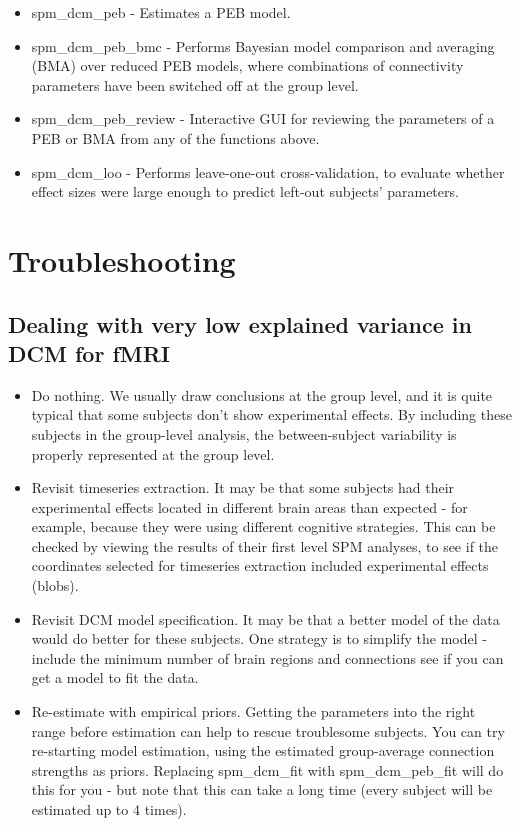 \documentclass{article}
\begin{document}
\begin{itemize}
    \item spm\_dcm\_peb - Estimates a PEB model.
    \item spm\_dcm\_peb\_bmc - Performs Bayesian model comparison and averaging (BMA) over reduced PEB models, where combinations of connectivity parameters have been switched off at the group level.
    \item spm\_dcm\_peb\_review - Interactive GUI for reviewing the parameters of a PEB or BMA from any of the functions above.
    \item spm\_dcm\_loo - Performs leave-one-out cross-validation, to evaluate whether effect sizes were large enough to predict left-out subjects' parameters.
\end{itemize}

\section{Troubleshooting}

\subsection{Dealing with very low explained variance in DCM for fMRI}
\begin{itemize}
\item Do nothing. We usually draw conclusions at the group level, and it is quite typical that some subjects don't show experimental effects. By including these subjects in the group-level analysis, the between-subject variability is properly represented at the group level.
\item Revisit timeseries extraction. It may be that some subjects had their experimental effects located in different brain areas than expected - for example, because they were using different cognitive strategies. This can be checked by viewing the results of their first level SPM analyses, to see if the coordinates  selected for timeseries extraction included experimental effects (blobs). 
\item Revisit DCM model specification. It may be that a better model of the data would do better for these subjects. One strategy is to simplify the model - include the minimum number of brain regions and connections see if you can get a model to fit the data.
\item Re-estimate with empirical priors. Getting the parameters into the right range before estimation can help to rescue troublesome subjects. You can try re-starting model estimation, using the estimated group-average connection strengths as priors. Replacing spm\_dcm\_fit with spm\_dcm\_peb\_fit will do this for you - but note that this can take a long time (every subject will be estimated up to 4 times).

\end{itemize}
\end{document}
